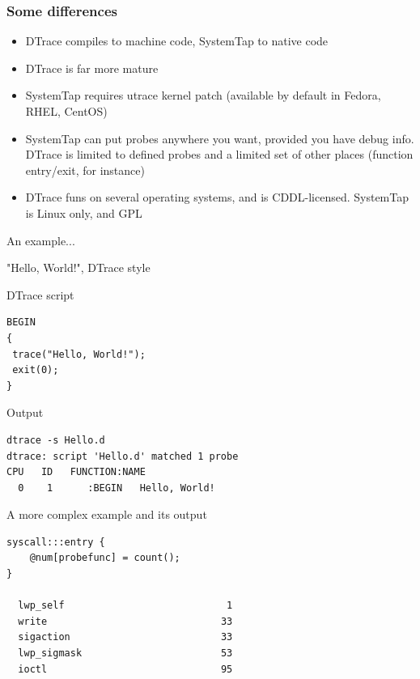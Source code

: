 \documentclass{beamer}
\begin{document}
\begin{frame}
     \frametitle{Some differences}
     \begin{itemize}
         \item DTrace compiles to machine code, SystemTap to native code
         \item DTrace is far more mature
         \item SystemTap requires utrace kernel patch (available by default in Fedora, RHEL, CentOS)
         \item SystemTap can put probes anywhere you want, provided you have debug info. DTrace is limited to defined probes and a limited set of other places (function entry/exit, for instance)
         \item DTrace funs on several operating systems, and is CDDL-licensed. SystemTap is Linux only, and GPL
     \end{itemize}
\end{frame}

\begin{frame}
    An example...
\end{frame}

\begin{frame}[fragile]
    "Hello, World!", DTrace style
    \begin{exampleblock}{DTrace script}
    \begin{lstlisting}
BEGIN 
{ 
 trace("Hello, World!"); 
 exit(0); 
}
    \end{lstlisting}
    \end{exampleblock}

    \begin{exampleblock}{Output}
    \begin{verbatim}
dtrace -s Hello.d 
dtrace: script 'Hello.d' matched 1 probe
CPU   ID   FUNCTION:NAME
  0    1      :BEGIN   Hello, World!
    \end{verbatim}
    \end{exampleblock}
\end{frame}

\begin{frame}[fragile]
    \begin{exampleblock}{A more complex example and its output}
    \begin{lstlisting}
syscall:::entry {
    @num[probefunc] = count();
}

  lwp_self                            1
  write                              33
  sigaction                          33
  lwp_sigmask                        53
  ioctl                              95
    \end{lstlisting}
    \end{exampleblock}
\end{frame}
\end{document}
